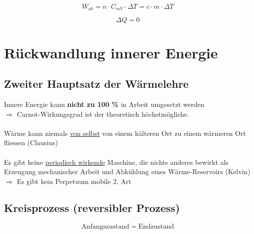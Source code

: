 \begin{minipage}{0.58\linewidth}
$$ \boxed{ W_{ab} = n \cdot C_{mV} \cdot \Delta T = c \cdot m \cdot \Delta T}  $$
\end{minipage}
\hfill
\begin{minipage}{0.38\linewidth}
$$ \boxed{ \Delta Q = 0} $$
\end{minipage}





\section{Rückwandlung innerer Energie}

\subsection{Zweiter Hauptsatz der Wärmelehre}
Innere Energie kann \textbf{nicht zu 100 \%} in Arbeit umgesetzt werden \\
$\Rightarrow$ Carnot-Wirkungsgrad ist der theoretisch höchstmögliche. \\
\\
Wärme kann niemals \underline{von selbst} von einem kälteren Ort zu einem wärmeren Ort fliessen (Clausius)\\
\\
Es gibt keine \underline{periodisch wirkende} Maschine, die nichts anderes bewirkt als Erzeugung mechanischer Arbeit und Abkühlung eines Wärme-Reservoirs (Kelvin) \\
$\Rightarrow$ Es gibt kein Perpetuum mobile 2. Art


\subsection{Kreisprozess (reversibler Prozess)}
$$ \text{Anfangszustand} \; = \; \text{Endzustand} $$ 


